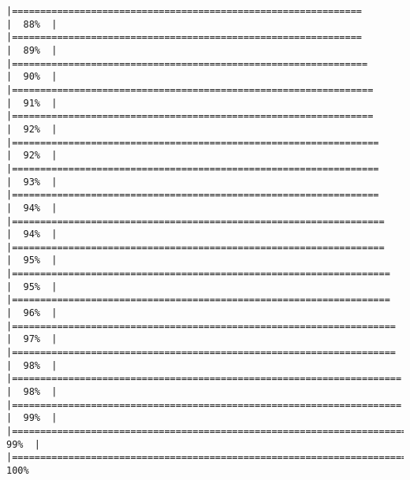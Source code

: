 \documentclass[
]{article}
\begin{document}
\begin{verbatim}
|==============================================================        |  88%  |                                                                              |==============================================================        |  89%  |                                                                              |===============================================================       |  90%  |                                                                              |================================================================      |  91%  |                                                                              |================================================================      |  92%  |                                                                              |=================================================================     |  92%  |                                                                              |=================================================================     |  93%  |                                                                              |=================================================================     |  94%  |                                                                              |==================================================================    |  94%  |                                                                              |==================================================================    |  95%  |                                                                              |===================================================================   |  95%  |                                                                              |===================================================================   |  96%  |                                                                              |====================================================================  |  97%  |                                                                              |====================================================================  |  98%  |                                                                              |===================================================================== |  98%  |                                                                              |===================================================================== |  99%  |                                                                              |======================================================================|  99%  |                                                                              |======================================================================| 100%
\end{verbatim}
\end{document}
